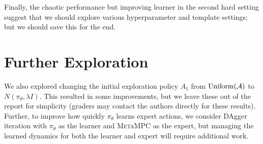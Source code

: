 \documentclass{article}
\begin{document}
Finally, the chaotic performance but improving learner in the second hard setting suggest that we should explore various hyperparameter and template settings; but we should save this for the end.

\section{Further Exploration}

We also explored changing the initial exploration policy $A_1$ from $\operatorname{Uniform}(\mathcal{A})$ to $N(\pi_\theta, \lambda I)$. This resulted in some improvements, but we leave these out of the report for simplicity (graders may contact the authors directly for these results). Further, to improve how quickly $\pi_\theta$ learns expert actions, we consider DAgger iteration with $\pi_\theta$ as the learner and \textsc{MetaMPC} as the expert, but managing the learned dynamics for both the learner and expert will require additional work.
\end{document}
